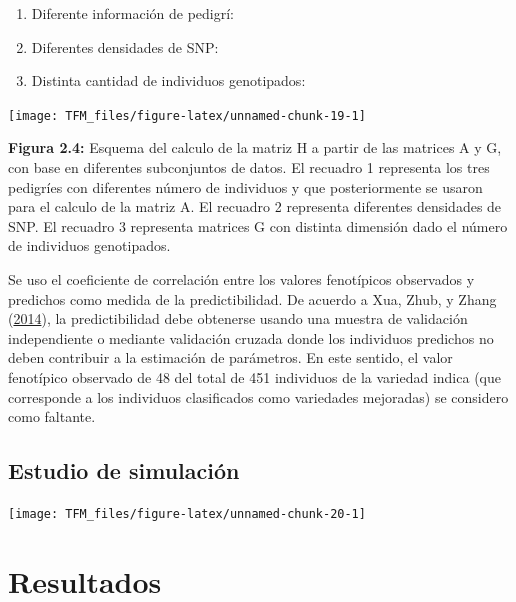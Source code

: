 \documentclass[11pt,spanish,a4paper,oneside,]{book} %
\begin{document}
\begin{enumerate}
\def\labelenumi{\arabic{enumi}.}
\item
  Diferente información de pedigrí:
\item
  Diferentes densidades de SNP:
\item
  Distinta cantidad de individuos genotipados:
\end{enumerate}

\begin{center}\texttt{[image: TFM\_files/figure-latex/unnamed-chunk-19-1]} \end{center}

\begin{center}
\textbf{Figura 2.4:} Esquema del calculo de la matriz H a partir de las matrices A y G, con base en diferentes subconjuntos de datos. El recuadro 1 representa los tres pedigríes con diferentes número de individuos y que posteriormente se usaron para el calculo de la matriz A. El recuadro 2 representa diferentes densidades de SNP. El recuadro 3 representa matrices G con distinta dimensión dado el número de individuos genotipados.

\end{center}

Se uso el coeficiente de correlación entre los valores fenotípicos observados y predichos como medida de la predictibilidad. De acuerdo a Xua, Zhub, y Zhang (\protect\hyperlink{ref-cite:25}{2014}), la predictibilidad debe obtenerse usando una muestra de validación independiente o mediante validación cruzada donde los individuos predichos no deben contribuir a la estimación de parámetros. En este sentido, el valor fenotípico observado de 48 del total de 451 individuos de la variedad indica (que corresponde a los individuos clasificados como variedades mejoradas) se considero como faltante.

\hypertarget{estudio-de-simulaciuxf3n}{%
\subsection{Estudio de simulación}\label{estudio-de-simulaciuxf3n}}

\begin{center}\texttt{[image: TFM\_files/figure-latex/unnamed-chunk-20-1]} \end{center}

\hypertarget{results2}{%
\section{Resultados}\label{results2}}
\end{document}
